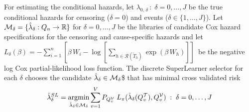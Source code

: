 \documentclass{report}
\DeclareMathOperator*{\argmin}{argmin}
\newcommand{\1}{\ensuremath{\mathbf{1}}}
\newcommand{\T}{\ensuremath{\widetilde{T}}}
\newcommand{\g}{\ensuremath{\pi}}
\renewcommand{\L}{\ensuremath{W}}
\begin{document}
For estimating the conditional hazards, let \(\lambda_{0,\,\delta} \,:\; \delta = 0, \dots, J\) be the true conditional hazards for censoring (\(\delta = 0\)) and events (\(\delta \in \{1, \dots, J\}\)). Let \(\mathcal{M}_\delta = \{\Hat{\lambda}_\delta : Q_n \to \mathbb{R}\}\) for \(\delta = 0, \dots, J\) be the libraries of candidate Cox hazard specifications for the censoring and cause-specific hazards and let \(L_\delta(\beta) = - \sum_{i=1}^{n} \left[\beta\,\L_i - \log\left[\sum_{h \in \mathcal{R}(\T_h)} \exp(\beta\,\L_h)\right]\right] \,\) be the negative log Cox partial-likelihood loss function. The discrete SuperLearner selector for each \(\delta\) chooses the candidate \(\Hat{\lambda}_\delta \in \mathcal{M}_\delta\)\$ that has minimal cross validated risk 
\begin{equation}
\Hat{\lambda}_\delta^{SL} = \argmin_{\Hat{\lambda}_\delta \in \mathcal{M}_\delta} \sum_{v = 1}^{V} P_{Q^\mathcal{V}_v} \; L_\g(\Hat{\lambda}_\delta(Q^\mathcal{T}_v), Q^\mathcal{V}_v) \;:\; \delta = 0, \dots, J\label{hazsl}
\end{equation}
\end{document}
